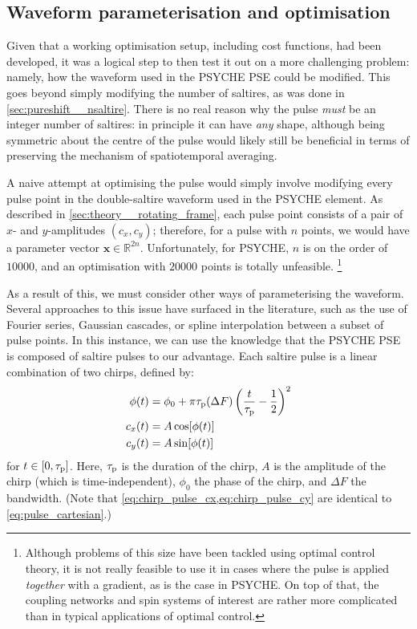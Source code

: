 \subsection{Waveform parameterisation and optimisation}
\label{subsec:pureshift__chirpopt}

Given that a working optimisation setup, including cost functions, had been developed, it was a logical step to then test it out on a more challenging problem: namely, how the waveform used in the PSYCHE PSE could be modified.
This goes beyond simply modifying the number of saltires, as was done in \cref{sec:pureshift__nsaltire}.
There is no real reason why the pulse \textit{must} be an integer number of saltires: in principle it can have \textit{any} shape, although being symmetric about the centre of the pulse would likely still be beneficial in terms of preserving the mechanism of spatiotemporal averaging.

A naive attempt at optimising the pulse would simply involve modifying every pulse point in the double-saltire waveform used in the PSYCHE element.
As described in \cref{sec:theory__rotating_frame}, each pulse point consists of a pair of $x$- and $y$-amplitudes $(c_x, c_y)$; therefore, for a pulse with $n$ points, we would have a parameter vector $\symbf{x} \in \mathbb{R}^{2n}$.
Unfortunately, for PSYCHE, $n$ is on the order of $10000$, and an optimisation with $20000$ points is totally unfeasible.%
\footnote{Although problems of this size have been tackled using optimal control theory\autocite{Khaneja2005JMR,deFouquieres2011JMR,Glaser2015EPJD,Goodwin2016JCP}, it is not really feasible to use it in cases where the pulse is applied \textit{together} with a gradient, as is the case in PSYCHE. On top of that, the coupling networks and spin systems of interest are rather more complicated than in typical applications of optimal control.}

As a result of this, we must consider other ways of parameterising the waveform.
Several approaches to this issue have surfaced in the literature, such as the use of Fourier series\autocite{Geen1991JMR,Kupce1995JMRSB}, Gaussian cascades\autocite{Emsley1990CPL}, or spline interpolation between a subset of pulse points\autocite{Ewing1990CP}.
In this instance, we can use the knowledge that the PSYCHE PSE is composed of saltire pulses to our advantage.
Each saltire pulse is a linear combination of two chirps, defined by:
\begin{align}
    \phi(t) &= \phi_0 + \pi\tau_\mathrm{p}(\Delta F)\left(\frac{t}{\tau_\mathrm{p}} - \frac{1}{2}\right)^2 \label{eq:chirp_pulse_phase} \\
    c_x(t) &= A \cos[\phi(t)] \label{eq:chirp_pulse_cx} \\
    c_y(t) &= A \sin[\phi(t)] \label{eq:chirp_pulse_cy}
\end{align}
for $t \in [0, \tau_\mathrm{p}]$. Here, $\tau_\mathrm{p}$ is the duration of the chirp, $A$ is the amplitude of the chirp (which is time-independent), $\phi_0$ the phase of the chirp, and $\Delta F$ the bandwidth.
(Note that \cref{eq:chirp_pulse_cx,eq:chirp_pulse_cy} are identical to \cref{eq:pulse_cartesian}.)

